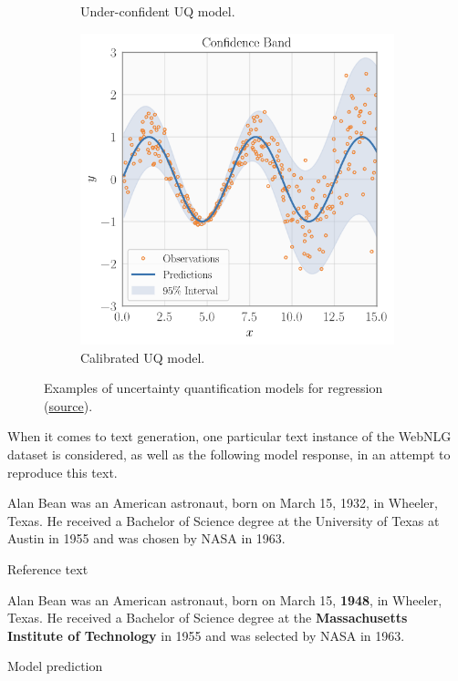 \begin{figure}
\begin{subfigure}[b]{0.32\textwidth}
         \caption{Under-confident UQ model.}
     \end{subfigure}
     \hfill
     \begin{subfigure}[b]{0.32\textwidth}
         \centering
         \includegraphics[width=\textwidth]{figures/intro/example-good.png}
         \caption{Calibrated UQ model.}
         \label{uq-regression-example-calibrated}
     \end{subfigure}
        \caption{Examples of uncertainty quantification models for regression (\href{https://github.com/uncertainty-toolbox/uncertainty-toolbox}{source}).}
        \label{fig:uq-regression-example}
\end{figure}


When it comes to text generation, one particular text instance of the WebNLG dataset is considered, as well as the following model response, in an attempt to reproduce this text.

\epigraph{Alan Bean was an American astronaut, born on March 15, 1932, in Wheeler, Texas. He received a Bachelor of Science degree at the University of Texas at Austin in 1955 and was chosen by NASA in 1963.}{Reference text}

\epigraph{
Alan Bean was an American astronaut, born on March 15, \textbf{1948}, in Wheeler, Texas. He received a Bachelor of Science degree at the \textbf{Massachusetts Institute of Technology} in 1955 and was selected by NASA in 1963.
}{Model prediction}


